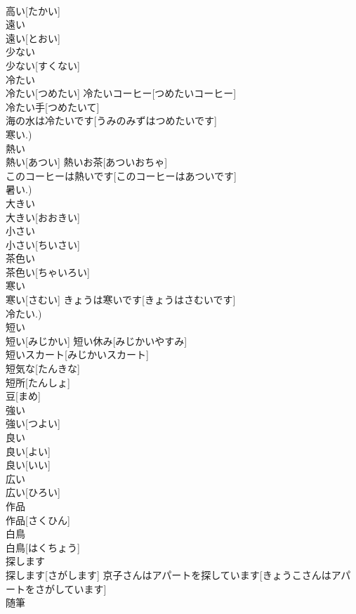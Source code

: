 \documentclass[8pt]{extreport}
\begin{document}
\begin{CJK}{UTF8}{min}
\\	高い[たかい]	
\\	遠い	
\\	遠い[とおい]	
\\	少ない	
\\	少ない[すくない]	
\\	冷たい	
\\	冷たい[つめたい]	冷たいコーヒー[つめたいコーヒー] 
\\	冷たい手[つめたいて] 
\\	海の水は冷たいです[うみのみずはつめたいです] 
\\	寒い.)
\\	熱い	
\\	熱い[あつい]	熱いお茶[あついおちゃ] 
\\	このコーヒーは熱いです[このコーヒーはあついです] 
\\	暑い.)
\\	大きい	
\\	大きい[おおきい]	
\\	小さい	
\\	小さい[ちいさい]	
\\	茶色い	
\\	茶色い[ちゃいろい]	
\\	寒い	
\\	寒い[さむい]	きょうは寒いです[きょうはさむいです] 
\\	冷たい.)
\\	短い	
\\	短い[みじかい]	短い休み[みじかいやすみ] 
\\	短いスカート[みじかいスカート] 
\\	短気な[たんきな] 
\\	短所[たんしょ] 
\\	豆[まめ] 
\\	強い	
\\	強い[つよい]	
\\	良い	
\\	良い[よい] 
\\	良い[いい]	
\\	広い	
\\	広い[ひろい]	
\\	作品	
\\	作品[さくひん]	
\\	白鳥	
\\	白鳥[はくちょう]	
\\	探します	
\\	探します[さがします]	京子さんはアパートを探しています[きょうこさんはアパートをさがしています] 
\\	随筆	

\end{CJK}
\end{document}
